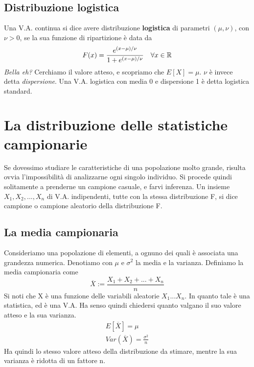 \documentclass[11pt]{article}
\begin{document}
\subsection{Distribuzione logistica}
Una V.A. continua si dice avere distribuzione \textbf{logistica} di parametri $(\mu, \nu)$, con $\nu>0$, se la sua funzione di ripartizione è data da
\begin{displaymath}
    F(x) = \frac{e^{(x-\mu)/\nu}}{1+e^{(x-\mu)/\nu}}\hspace{10px}\forall x \in \mathbb{R}
\end{displaymath}
\textit{Bella eh?} Cerchiamo il valore atteso, e scopriamo che $E[X] = \mu$. $\nu$ è invece detta \textit{dispersione}. Una V.A. logistica con media 0 e dispersione 1 è detta logistica standard.
\section{La distribuzione delle statistiche campionarie}
Se dovessimo studiare le caratteristiche di una popolazione molto grande, risulta ovvia l'impossibilità di analizzarne ogni singolo individuo. Si procede quindi solitamente a prenderne un campione casuale, e farvi inferenza.
Un insieme $X_1,X_2,...,X_n$ di V.A. indipendenti, tutte con la stessa distribuzione F, si dice campione o campione aleatorio della distribuzione F.
\subsection{La media campionaria}
Consideriamo una popolazione di elementi, a ognuno dei quali è associata una grandezza numerica. Denotiamo con $\mu$ e $\sigma^2$ la media e la varianza. Definiamo la media campionaria come
\begin{displaymath}
    \overline{X}:=\frac{X_1+X_2+...+X_n}{n}
\end{displaymath}
Si noti che X è una funzione delle variabili aleatorie $X_1...X_n$. In quanto tale è una statistica, ed è una V.A. Ha senso quindi chiedersi quanto valgano il suo valore atteso e la sua varianza.
\begin{gather*}
    E[\overline{X}]=\mu\\ 
    Var(\overline{X})=\frac{\sigma^2}{n}
\end{gather*}
Ha quindi lo stesso valore atteso della distribuzione da stimare, mentre la sua varianza è ridotta di un fattore n. 
\end{document}
